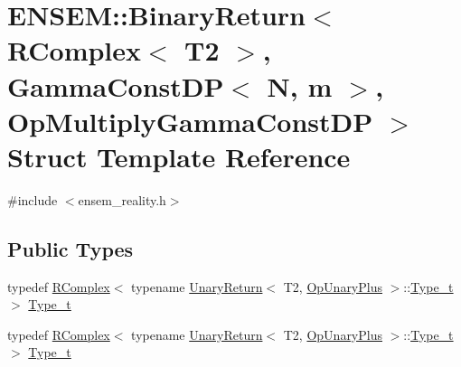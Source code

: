 \hypertarget{structENSEM_1_1BinaryReturn_3_01RComplex_3_01T2_01_4_00_01GammaConstDP_3_01N_00_01m_01_4_00_01OpMultiplyGammaConstDP_01_4}{}\section{E\+N\+S\+EM\+:\+:Binary\+Return$<$ R\+Complex$<$ T2 $>$, Gamma\+Const\+DP$<$ N, m $>$, Op\+Multiply\+Gamma\+Const\+DP $>$ Struct Template Reference}
\label{structENSEM_1_1BinaryReturn_3_01RComplex_3_01T2_01_4_00_01GammaConstDP_3_01N_00_01m_01_4_00_01OpMultiplyGammaConstDP_01_4}


{\ttfamily \#include $<$ensem\+\_\+reality.\+h$>$}

\subsection*{Public Types}
\begin{DoxyCompactItemize}
\item 
typedef \mbox{\hyperlink{classENSEM_1_1RComplex}{R\+Complex}}$<$ typename \mbox{\hyperlink{structENSEM_1_1UnaryReturn}{Unary\+Return}}$<$ T2, \mbox{\hyperlink{structENSEM_1_1OpUnaryPlus}{Op\+Unary\+Plus}} $>$\+::\mbox{\hyperlink{structENSEM_1_1BinaryReturn_3_01RComplex_3_01T2_01_4_00_01GammaConstDP_3_01N_00_01m_01_4_00_01OpMultiplyGammaConstDP_01_4_aea7c67b0aab65299ac861f01f5ec8737}{Type\+\_\+t}} $>$ \mbox{\hyperlink{structENSEM_1_1BinaryReturn_3_01RComplex_3_01T2_01_4_00_01GammaConstDP_3_01N_00_01m_01_4_00_01OpMultiplyGammaConstDP_01_4_aea7c67b0aab65299ac861f01f5ec8737}{Type\+\_\+t}}
\item 
typedef \mbox{\hyperlink{classENSEM_1_1RComplex}{R\+Complex}}$<$ typename \mbox{\hyperlink{structENSEM_1_1UnaryReturn}{Unary\+Return}}$<$ T2, \mbox{\hyperlink{structENSEM_1_1OpUnaryPlus}{Op\+Unary\+Plus}} $>$\+::\mbox{\hyperlink{structENSEM_1_1BinaryReturn_3_01RComplex_3_01T2_01_4_00_01GammaConstDP_3_01N_00_01m_01_4_00_01OpMultiplyGammaConstDP_01_4_aea7c67b0aab65299ac861f01f5ec8737}{Type\+\_\+t}} $>$ \mbox{\hyperlink{structENSEM_1_1BinaryReturn_3_01RComplex_3_01T2_01_4_00_01GammaConstDP_3_01N_00_01m_01_4_00_01OpMultiplyGammaConstDP_01_4_aea7c67b0aab65299ac861f01f5ec8737}{Type\+\_\+t}}
\end{DoxyCompactItemize}


